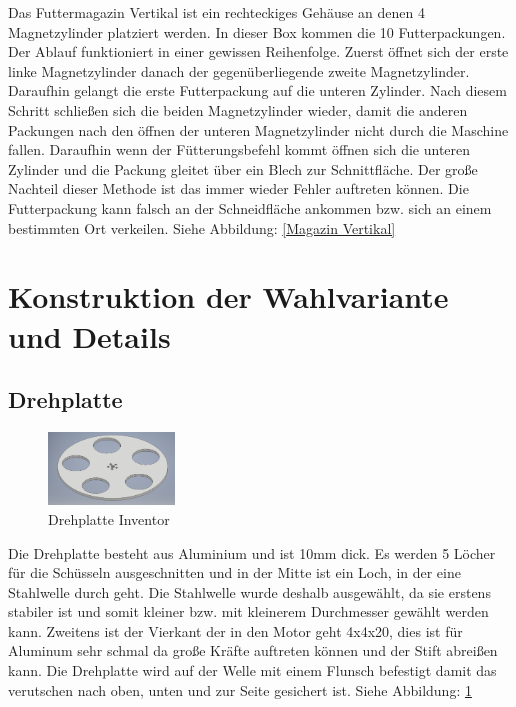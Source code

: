 Das Futtermagazin Vertikal ist ein rechteckiges Gehäuse an denen 4 Magnetzylinder platziert werden. In dieser Box kommen die 10 Futterpackungen. Der Ablauf funktioniert in einer gewissen Reihenfolge. Zuerst öffnet sich der erste linke Magnetzylinder danach der gegenüberliegende zweite Magnetzylinder. Daraufhin gelangt die erste Futterpackung auf die unteren Zylinder. Nach diesem Schritt schließen sich die beiden Magnetzylinder wieder, damit die anderen Packungen nach den öffnen der unteren Magnetzylinder nicht durch die Maschine fallen. Daraufhin wenn der Fütterungsbefehl kommt öffnen sich die unteren Zylinder und die Packung gleitet über ein Blech zur Schnittfläche. Der große Nachteil dieser Methode ist das immer wieder Fehler auftreten können. Die Futterpackung kann falsch an der Schneidfläche ankommen bzw. sich an einem bestimmten Ort verkeilen. Siehe Abbildung: \ref{Magazin Vertikal}

\section{Konstruktion der Wahlvariante und Details}

\subsection{Drehplatte}

\begin{figure}
\vspace{-20pt}
  \begin{center}
    \includegraphics[width=0.30\textwidth]{Bilder/Inventor/Drehplatte}
  \end{center}
  \caption{Drehplatte Inventor}
  \label{Drehplatte_Inventor}
  \vspace{-10pt}
\end{figure}

Die Drehplatte besteht aus Aluminium und ist 10mm dick. Es werden 5 Löcher für die Schüsseln ausgeschnitten und in der Mitte ist ein Loch, in der eine Stahlwelle durch geht. Die Stahlwelle wurde deshalb ausgewählt, da sie erstens stabiler ist und somit kleiner bzw. mit kleinerem Durchmesser gewählt werden kann. Zweitens ist der Vierkant der in den Motor geht 4x4x20, dies ist für Aluminum sehr schmal da große Kräfte auftreten können und der Stift abreißen kann. Die Drehplatte wird auf der Welle mit einem Flunsch befestigt damit das verutschen nach oben, unten und zur Seite gesichert ist. Siehe Abbildung: \ref{Drehplatte_Inventor}


